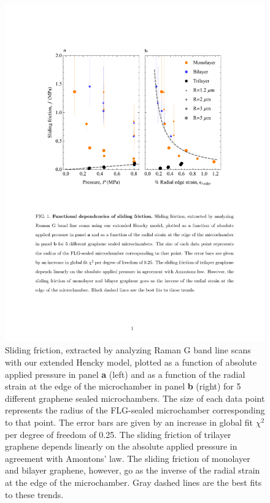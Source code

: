 \begin{figure}
\begin{center}
\includegraphics{Figs_Friction/Figure_5.pdf}
\end{center}
\caption{\label{FvsP}  Sliding friction, extracted by analyzing Raman G band line scans with our extended Hencky model, plotted as a function of absolute applied pressure in panel \textbf{a} (left) and as a function of the radial strain at the edge of the microchamber in panel \textbf{b} (right) for 5 different graphene sealed microchambers.  The size of each data point represents the radius of the FLG-sealed microchamber corresponding to that point. The error bars are given by an increase in global fit $\chi^2$ per degree of freedom of 0.25.  The sliding friction of trilayer graphene depends linearly on the absolute applied pressure in agreement with Amontons' law. The sliding friction of monolayer and bilayer graphene, however, go as the inverse of the radial strain at the edge of the microchamber.  Gray dashed lines are the best fits to these trends.}
\end{figure}

